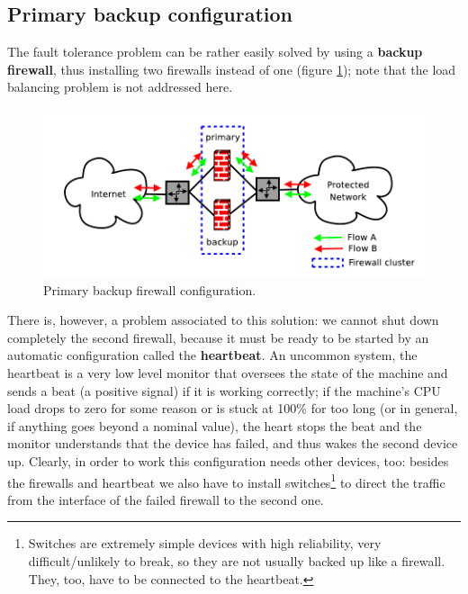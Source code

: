 \vspace{0.5em}


\subsection{Primary backup configuration}
The fault tolerance problem can be rather easily solved by using a \textbf{backup firewall}, thus installing two firewalls instead of one (figure \ref{fig:primary_backup_fw}); note that the load balancing problem is not addressed here.

\begin{figure}[h]
    \centering
    \includegraphics[scale=0.7]{img/primary_backup_fw.png}
    \decoRule
    \caption{Primary backup firewall configuration.}
    \label{fig:primary_backup_fw}
\end{figure}

There is, however, a problem associated to this solution: we cannot shut down completely the second firewall, because it must be ready to be started by an automatic configuration called the \textbf{heartbeat}. An uncommon system, the heartbeat is a very low level monitor that oversees the state of the machine and sends a beat (a positive signal) if it is working correctly; if the machine's CPU load drops to zero for some reason or is stuck at 100\% for too long (or in general, if anything goes beyond a nominal value), the heart stops the beat and the monitor understands that the device has failed, and thus wakes the second device up. Clearly, in order to work this configuration needs other devices, too: besides the firewalls and heartbeat we also have to install switches\footnote{Switches are extremely simple devices with high reliability, very difficult/unlikely to break, so they are not usually backed up like a firewall. They, too, have to be connected to the heartbeat.} to direct the traffic from the interface of the failed firewall to the second one.

